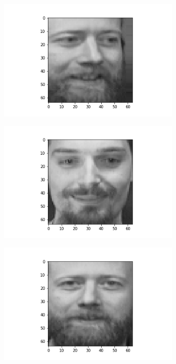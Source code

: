 \documentclass[12pt, a4paper]{article}
\begin{document}
\begin{figure}[h]
    \begin{subfigure}{0.3\linewidth}
        \centering
        \includegraphics[width=\linewidth]{images/q3/c/7/0.png}
    \end{subfigure}
    \hfill
    \begin{subfigure}{0.3\linewidth}
        \centering
        \includegraphics[width=\linewidth]{images/q3/c/7/1.png}
    \end{subfigure}
    \hfill
    \begin{subfigure}{0.3\linewidth}
        \centering
        \includegraphics[width=\linewidth]{images/q3/c/7/2.png}

\end{subfigure}
\end{figure}
\end{document}
